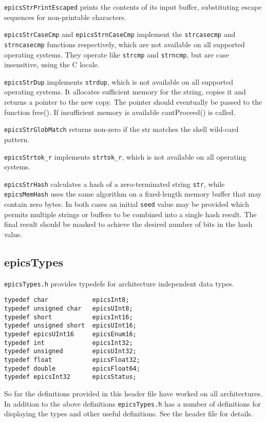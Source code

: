\verb|epicsStrPrintEscaped| prints the contents of its input buffer, substituting escape sequences for non-printable characters.

\verb|epicsStrCaseCmp| and \verb|epicsStrnCaseCmp| implement the \verb|strcasecmp| and \verb|strncasecmp| functions respectively, which are not available on all supported operating systems.
They operate like \verb|strcmp| and \verb|strncmp|, but are case insensitive, using the C locale.

\verb|epicsStrDup| implements \verb|strdup|, which is not available on all supported operating systems.
It allocates sufficient memory for the string, copies it and returns a pointer to the new copy.
The pointer should eventually be passed to the function free().
If insufficient memory is available cantProceed() is called.

\verb|epicsStrGlobMatch| returns non-zero if the str matches the shell wild-card pattern.

\verb|epicsStrtok_r| implements \verb|strtok_r|, which is not available on all operating systems.

\verb|epicsStrHash| calculates a hash of a zero-terminated string \verb|str|, while \verb|epicsMemHash| uses the same algorithm on a fixed-length memory buffer that may contain zero bytes.
In both cases an initial \verb|seed| value may be provided which permits multiple strings or buffers to be combined into a single hash result.
The final result should be masked to achieve the desired number of bits in the hash value.

\subsection{epicsTypes}

\verb|epicsTypes.h| provides typedefs for architecture independent data types.

\begin{verbatim}
typedef char            epicsInt8;
typedef unsigned char   epicsUInt8;
typedef short           epicsInt16;
typedef unsigned short  epicsUInt16;
typedef epicsUInt16     epicsEnum16;
typedef int             epicsInt32;
typedef unsigned        epicsUInt32;
typedef float           epicsFloat32;
typedef double          epicsFloat64;
typedef epicsInt32      epicsStatus;
\end{verbatim}

So far the definitions provided in this header file have worked on all architectures.
In addition to the above definitions \verb|epicsTypes.h| has a number of definitions for displaying the types and other useful definitions.
See the header file for details.

